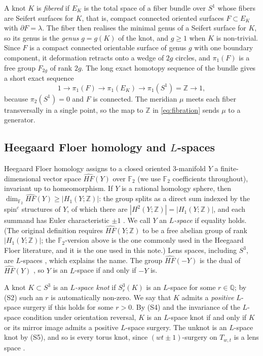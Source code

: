 \documentclass[11pt]{article}
\newcommand{\Z}{\mathbb Z}
\newcommand{\Q}{\mathbb Q}
\newcommand{\F}{\mathbb F}
\newcommand{\Surg}[2]{S^3_{#1}(#2)}
\newcommand{\HFhat}{\widehat{HF}}
\theoremstyle{definition}
\theoremstyle{remark}
\begin{document}
A knot \(K\) is \emph{fibered} if \(E_K\) is the total space of a fiber
bundle over \(S^1\) whose fibers are Seifert surfaces for \(K\), that is,
compact connected oriented surfaces \(F\subset E_K\) with
\(\partial F=\lambda\). The fiber then realises the minimal genus of a
Seifert surface for \(K\), so its genus is the \emph{genus} \(g=g(K)\)
of the knot, and \(g\geq1\) when \(K\) is non-trivial. Since \(F\) is a
compact connected orientable surface of genus \(g\) with one boundary
component, it deformation retracts onto a wedge of \(2g\) circles, and
\(\pi_1(F)\) is a free group \(F_{2g}\) of rank \(2g\). The long exact
homotopy sequence of the bundle gives a short exact sequence
\begin{equation}\label{eq:fibration}
 1\longrightarrow\pi_1(F)\longrightarrow\pi_1(E_K)
 \longrightarrow\pi_1(S^1)=\Z\longrightarrow1,
\end{equation}
because \(\pi_2(S^1)=0\) and \(F\) is connected. The meridian \(\mu\)
meets each fiber transversally in a single point, so the map to \(\Z\)
in \eqref{eq:fibration} sends \(\mu\) to a generator.

\subsection{Heegaard Floer homology and \texorpdfstring{\(L\)}{L}-spaces}\label{sec:Lspace}

Heegaard Floer homology \cite{OS2004a} assigns to a closed oriented
\(3\)-manifold \(Y\) a finite-dimensional vector space \(\HFhat(Y)\) over
\(\F_2\) (we use \(\F_2\) coefficients throughout), invariant up to
homeomorphism. If \(Y\) is a rational homology sphere, then
\(\dim_{\F_2}\HFhat(Y)\geq|H_1(Y;\Z)|\): the group splits as a direct
sum indexed by the spin\(^c\) structures of \(Y\), of which there are
\(|H^2(Y;\Z)|=|H_1(Y;\Z)|\), and each summand has Euler characteristic
\(\pm1\) \cite[Proposition~5.1]{OS2004b}. We call \(Y\) an
\emph{\(L\)-space} if equality holds. (The original definition
\cite[Definition~1.1]{OS2005} requires \(\HFhat(Y;\Z)\) to be a free
abelian group of rank \(|H_1(Y;\Z)|\); the \(\F_2\)-version above is
the one commonly used in the Heegaard Floer literature, and it is the one
used in this note.)
Lens spaces, including \(S^3\), are \(L\)-spaces
\cite[Proposition~3.1]{OS2004b}, which explains the name. The group
\(\HFhat(-Y)\) is the dual of \(\HFhat(Y)\)
\cite[Proposition~2.5]{OS2004b}, so \(Y\) is an \(L\)-space if and only
if \(-Y\) is.

A knot \(K\subset S^3\) is an \emph{\(L\)-space knot} if \(\Surg{r}{K}\)
is an \(L\)-space for some \(r\in\Q\); by (S2) such an \(r\) is
automatically non-zero. We say that \(K\) admits a \emph{positive}
\(L\)-space surgery if this holds for some \(r>0\). By (S4) and the
invariance of the \(L\)-space condition under orientation reversal,
\(K\) is an \(L\)-space knot if and only if \(K\) or its mirror image
admits a positive \(L\)-space surgery. The unknot is an \(L\)-space knot
by (S5), and so is every torus knot, since \((wt\pm1)\)-surgery on
\(T_{w,t}\) is a lens space \cite{Moser1971}.
\end{document}
